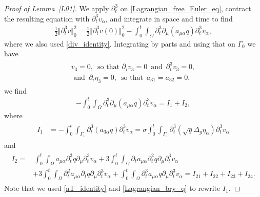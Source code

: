 \documentclass[10pt,reqno]{amsart}
\theoremstyle{plain}
\theoremstyle{definition}
\numberwithin{equation}{section}
\newcommand{\al}{\alpha}
\newcommand{\Ga}{\Gamma}
\newcommand{\si}{\sigma}
\newcommand{\Om}{\Omega}
\newcommand{\norm}[1]{\Vert#1\Vert}
\begin{document}
\begin{proof}[Proof of Lemma~\ref{L01}]
We apply $\partial^3_t$ on \eqref{Lagrangian_free_Euler_eq}, contract the resulting equation with $\partial^3_t v_\al$,
and integrate in space and time to find
\begin{align}
\frac{1}{2} \norm{ \partial^3_t v }^2_0 = \frac{1}{2} \norm{\partial^3_t v(0)}^2_0
-\int_0^t \int_\Om \partial^3_t \partial_\mu( a_{\mu \al} q ) \partial^3_t v_\al,
\label{energy_identity_L_2}
\end{align}
where we also used \eqref{div_identity}. Integrating by parts and using that on $\Ga_0$ we have
\begin{align}
\begin{split}
v_3 = 0, \, \text{ so that } \partial_i v_3 = 0 \, \text{ and } \, \partial^3_t v_3 = 0, 
\\
\text{ and } \, \partial_i \eta_3 = 0, \, \text{ so that } \, a_{31} = a_{32} = 0
,
\end{split}
\label{conditions_Ga_0}
\end{align}
we find 
\begin{gather}
 -\int_0^t \int_\Om \partial^3_t \partial_\mu( a_{\mu \al} q ) \partial^3_t v_\al 
= I_1 + I_2,
\label{I_def}
\end{gather}
where 
\begin{align} 
\begin{split}
I_1 
  & = 
  - \int_0^t \int_{\Ga_1} \partial^3_t ( a_{3 \al} q ) \partial^3_t v_\al 
= \si \int_0^t \int_{\Ga_1} \partial^3_t(\sqrt{g} \Delta_g \eta_\al ) \partial^3_t v_\al
\end{split}
\label{I_1_def}
\end{align}
and 
\begin{align}
\begin{split}
I_2 
=  & \, \int_0^t \int_\Om a_{\mu\al} \partial^3_t q \partial_\mu \partial^3_t v_\al
+ 3 \int_0^t \int_\Om \partial_t a_{\mu\al} \partial^2_t q \partial_\mu \partial^3_t v_\al 
\\
& 
+ 3 \int_0^t \int_\Om \partial^2_t a_{\mu \al} \partial_t q \partial_\mu \partial^3_t v_\al
+ \int_0^t \int_\Om \partial^3_t a_{\mu \al} q \partial_\mu \partial^3_t v_\al 
=  I_{21} + I_{22} + I_{23} + I_{24}.
\end{split}
\label{I_2_def}
\end{align}
Note that we used \eqref{aT_identity}  and  \eqref{Lagrangian_bry_q} to rewrite $I_1$.


\end{proof}
\end{document}
